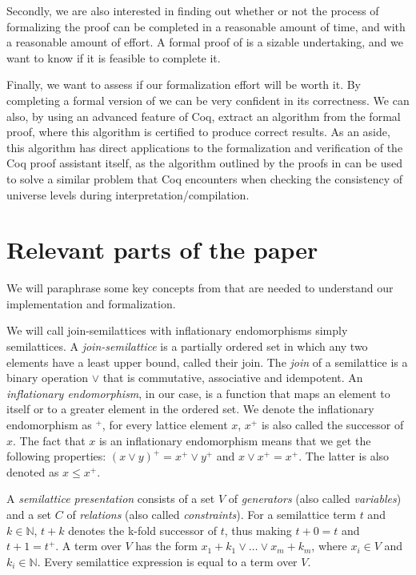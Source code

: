 Secondly, we are also interested in finding out whether or not the process of formalizing the proof
can be completed in a reasonable amount of time, and with a reasonable amount of effort.
A formal proof of  is a sizable undertaking, and we want to know if it is feasible to complete it.

Finally, we want to assess if our formalization effort will be worth it.
By completing a formal version of  we can be very confident in its correctness.
We can also, by using an advanced feature of Coq, extract an algorithm from the formal proof,
where this algorithm is certified to produce correct results.
As an aside, this algorithm has direct applications to the formalization and verification of the Coq proof assistant itself,
as the algorithm outlined by the proofs in \cite{mbezem} can be used to solve a similar problem that Coq encounters when
checking the consistency of universe levels during interpretation/compilation.

\section{Relevant parts of the paper}
\label{sec:relevant_parts_of_the_paper}

We will paraphrase some key concepts from \cite{mbezem} that are needed to understand
our implementation and formalization.

We will call join-semilattices with inflationary endomorphisms simply semilattices.
A \emph{join-semilattice} is a partially ordered set in which any two elements have a least upper bound,
called their join.
The \emph{join} of a semilattice is a binary operation $\lor$ that is commutative, associative and idempotent.
An \emph{inflationary endomorphism}, in our case, is a function
that maps an element to itself or to a greater element in the ordered set.
We denote the inflationary endomorphism as $^+$, for every lattice element $x$,
$x^+$ is also called the successor of $x$.
The fact that $x$ is an inflationary endomorphism means that we get the following properties:
$(x \lor y)^+ = x^+ \lor y^+$ and $x \lor x^+ = x^+$.
The latter is also denoted as $x \leq x^+$.


A \emph{semilattice presentation} consists of a set $V$ of \emph{generators}
(also called \emph{variables}) and a set $C$ of \emph{relations}
(also called \emph{constraints}).
For a semilattice term $t$ and $k \in \mathbb{N}$, $t + k$ denotes the k-fold successor of $t$, thus making $t + 0 = t$ and $t + 1 = t^+$.
A term over $V$ has the form $x_1 + k_1 \lor \ldots \lor x_m + k_m$, where $x_i \in V$ and $k_i \in \mathbb{N}$.
Every semilattice expression is equal to a term over $V$.

